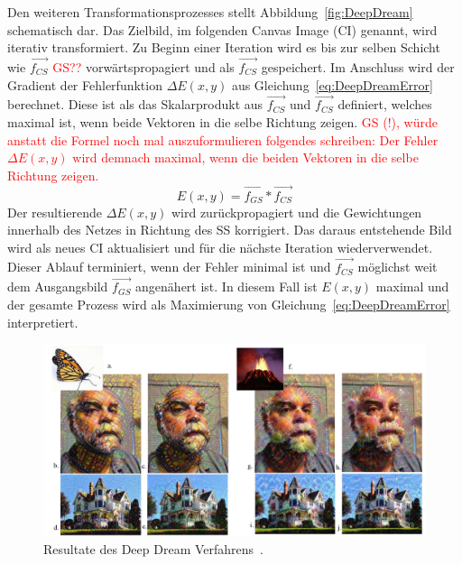 \documentclass[times, 11pt,twocolumn]{article}
\begin{document}
Den weiteren Transformationsprozesses stellt Abbildung~\ref{fig:DeepDream} schematisch dar. Das Zielbild, im folgenden Canvas Image (CI) genannt, wird iterativ transformiert. Zu Beginn einer Iteration wird es bis zur selben Schicht wie $\vec{f_{CS}}$ \textcolor{red}{GS??} vorwärtspropagiert und als $\vec{f_{CS}}$ gespeichert. Im Anschluss wird der Gradient der Fehlerfunktion $\Delta E(x,y)$ aus Gleichung~\ref{eq:DeepDreamError} berechnet. Diese ist als das Skalarprodukt aus $\vec{f_{CS}}$ und $\vec{f_{CS}}$ definiert, welches maximal ist, wenn beide Vektoren in die selbe Richtung zeigen. \textcolor{red}{GS (!), würde anstatt die Formel noch mal auszuformulieren folgendes schreiben: Der Fehler $\Delta E(x,y)$ wird demnach maximal, wenn die beiden Vektoren in die selbe Richtung zeigen.}
\footnotesize
\begin{equation}
E(x,y)= \vec{f_{GS}}* \vec{f_{CS}}
\label{eq:DeepDreamError}
\end{equation}
\small
Der resultierende $\Delta E(x,y)$ wird zurückpropagiert und die Gewichtungen innerhalb des Netzes in Richtung des SS korrigiert. Das daraus entstehende Bild wird als neues CI aktualisiert und für die nächste Iteration wiederverwendet.
Dieser Ablauf terminiert, wenn der Fehler minimal ist und $\vec{f_{CS}}$ möglichst weit dem Ausgangsbild $\vec{f_{GS}}$ angenähert ist. In diesem Fall ist $E(x,y)$ maximal und der gesamte Prozess wird als Maximierung von Gleichung~\ref{eq:DeepDreamError} interpretiert.\\

\begin{figure}
	\flushleft
	\includegraphics[width=\columnwidth]{Bilder/DeepDreamResults.JPG}
	\caption{Resultate des Deep Dream Verfahrens~\cite{McCaigDG16}.}
	\label{fig:DeepDreamResults}
\end{figure}
\end{document}
